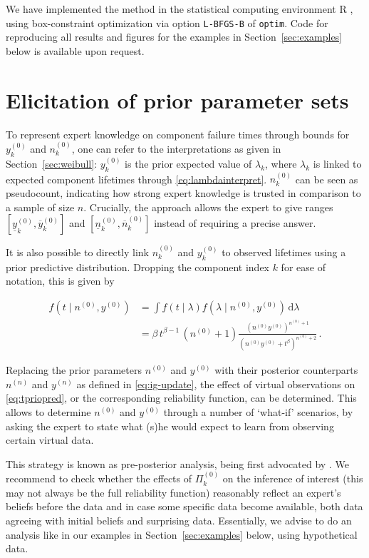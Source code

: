 \documentclass[Journal,letterpaper]{ascelike-new}
\newcommand{\dd}{\,\mathrm{d}}
\newcommand{\uz}{^{(0)}} %
\newcommand{\un}{^{(n)}} %
\newcommand{\ul}[1]{\underline{#1}}
\newcommand{\ol}[1]{\overline{#1}}
\def\yz{y\uz}
\def\yn{y\un}
\def\ykz{y\uz_k}
\def\ykzl{\ul{y}\uz_k}
\def\ykzu{\ol{y}\uz_k}
\def\nz{n\uz}
\def\nn{n\un}
\def\nkz{n\uz_k}
\def\nkzl{\ul{n}\uz_k}
\def\nkzu{\ol{n}\uz_k}
\def\PkZ{\Pi\uz_k}
\begin{document}
We have implemented the method in the statistical computing environment \textsf{R} \cite{R},
using box-constraint optimization via option \texttt{L-BFGS-B} of \texttt{optim}.
Code for reproducing all results and figures for the examples in Section~\ref{sec:examples} below is available upon request.


\section{Elicitation of prior parameter sets}
\label{sec:elicitation}

To represent expert knowledge on component failure times
through bounds for $\ykz$ and $\nkz$,
one can refer to the interpretations as given in Section~\ref{sec:weibull}:
$\ykz$ is the prior expected value of $\lambda_k$,
where $\lambda_k$ is linked to expected component lifetimes through \eqref{eq:lambdainterpret}.
$\nkz$ can be seen as pseudocount, indicating how strong expert knowledge is trusted
in comparison to a sample of size $n$.
Crucially, the approach allows the expert to give ranges $[\ykzl, \ykzu]$ and $[\nkzl, \nkzu]$
instead of requiring a precise answer.

It is also possible to directly link $\nkz$ and $\ykz$
to observed lifetimes using a prior predictive distribution.
Dropping the component index $k$ for ease of notation, this is given by
\begin{linenomath*}
\begin{align}
f(t\mid \nz, \yz)
 &= \int f(t\mid \lambda) f(\lambda\mid\nz,\yz) \dd \lambda \nonumber\\
 &= \beta\, t^{\beta - 1}\, (\nz + 1) \frac{(\nz \yz)^{\nz + 1}}{(\nz \yz + t^\beta)^{\nz + 2}} \,.
\label{eq:tpriopred}
\end{align}
\end{linenomath*}
Replacing the prior parameters $\nz$ and $\yz$
with their posterior counterparts $\nn$ and $\yn$ as defined in \eqref{eq:ig-update},
the effect of virtual observations on \eqref{eq:tpriopred}, or the corresponding reliability function, can be determined.
This allows to determine $\nz$ and $\yz$ through a number of `what-if' scenarios,
by asking the expert to state what (s)he would expect to learn from observing certain virtual data.

This strategy is known as pre-posterior analysis,
being first advocated by .
We recommend to check whether the effects of $\PkZ$ on the inference of interest
(this may not always be the full reliability function)
reasonably reflect an expert's beliefs before the data and in case some specific data become available,
both data agreeing with initial beliefs and surprising data.
Essentially, we advise to do an analysis like in our examples in Section~\ref{sec:examples} below,
using hypothetical data.
\end{document}
